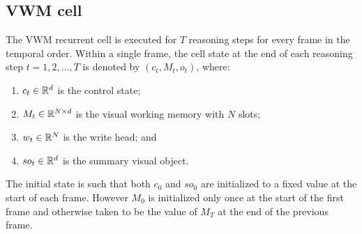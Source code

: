 \hrulefill

\subsection{VWM cell}

The VWM recurrent cell is executed for $T$ reasoning steps for every frame in
the temporal order.  Within a single frame, the cell state at the end of each reasoning step 
$t=1,2, \dots, T$ is denoted by $(c_t, M_t, o_t)$, where: 
\begin{enumerate}
	\item $c_t \in \mathbb{R}^d$ is the control state;
	\item $M_t \in  \mathbb{R}^{N \times d}$ is the visual working memory with $N$ slots;
	\item $w_t \in  \mathbb{R}^N$ is the write head; and
	\item $so_t  \in \mathbb{R}^d$ is the summary visual object.
\end{enumerate} 
The initial state is such that both $c_0$ and $so_0$ are initialized
to a fixed value at the start of each frame. However $M_0$ is initialized only once at
the start of the first frame and otherwise taken to be the value of $M_T$ at the
end of the previous frame.



%

